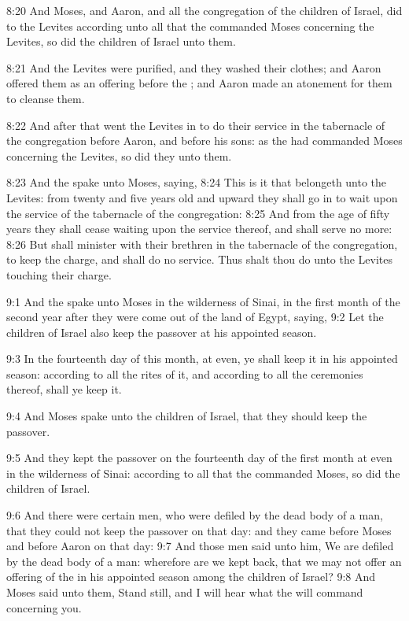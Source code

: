 8:20 And Moses, and Aaron, and all the congregation of the children of Israel, did to the Levites according unto all that the \LORD commanded Moses concerning the Levites, so did the children of Israel unto them.

8:21 And the Levites were purified, and they washed their clothes; and Aaron offered them as an offering before the \LORD; and Aaron made an atonement for them to cleanse them.

8:22 And after that went the Levites in to do their service in the tabernacle of the congregation before Aaron, and before his sons: as the \LORD had commanded Moses concerning the Levites, so did they unto them.

8:23 And the \LORD spake unto Moses, saying, 8:24 This is it that belongeth unto the Levites: from twenty and five years old and upward they shall go in to wait upon the service of the tabernacle of the congregation: 8:25 And from the age of fifty years they shall cease waiting upon the service thereof, and shall serve no more: 8:26 But shall minister with their brethren in the tabernacle of the congregation, to keep the charge, and shall do no service. Thus shalt thou do unto the Levites touching their charge.

9:1 And the \LORD spake unto Moses in the wilderness of Sinai, in the first month of the second year after they were come out of the land of Egypt, saying, 9:2 Let the children of Israel also keep the passover at his appointed season.

9:3 In the fourteenth day of this month, at even, ye shall keep it in his appointed season: according to all the rites of it, and according to all the ceremonies thereof, shall ye keep it.

9:4 And Moses spake unto the children of Israel, that they should keep the passover.

9:5 And they kept the passover on the fourteenth day of the first month at even in the wilderness of Sinai: according to all that the \LORD commanded Moses, so did the children of Israel.

9:6 And there were certain men, who were defiled by the dead body of a man, that they could not keep the passover on that day: and they came before Moses and before Aaron on that day: 9:7 And those men said unto him, We are defiled by the dead body of a man: wherefore are we kept back, that we may not offer an offering of the \LORD in his appointed season among the children of Israel?  9:8 And Moses said unto them, Stand still, and I will hear what the \LORD will command concerning you.

